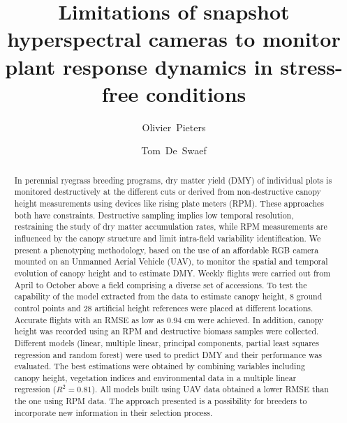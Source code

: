 \documentclass[10pt,authoryear,a4paper]{elsarticle}
\begin{document}
\begin{frontmatter}

\title{Limitations of snapshot hyperspectral cameras to monitor plant response dynamics in stress-free conditions}


\author[a,b]{Olivier~Pieters}

\author[b]{Tom~De~Swaef}


\address[a]{IDLab-AIRO -- Ghent University -- imec, Technologiepark-Zwijnaarde 126, 9052 Zwijnaarde, Belgium}
\address[b]{Plant Sciences Unit, Flanders Research Institute for Agriculture, Fisheries and Food, Caritasstraat 39, 9090 Melle, Belgium}

\begin{abstract}  
    In perennial ryegrass breeding programs, dry matter yield (DMY) of
    individual plots is monitored destructively at the different cuts or
    derived from non-destructive canopy height measurements using devices
    like rising plate meters (RPM). These approaches both have constraints.
    Destructive sampling implies low temporal resolution, restraining the
    study of dry matter accumulation rates, while RPM measurements are
    influenced by the canopy structure and limit intra-field variability
    identification. We present a phenotyping methodology, based on the use
    of an affordable RGB camera mounted on an Unmanned Aerial Vehicle (UAV),
    to monitor the spatial and temporal evolution of canopy height and to
    estimate DMY. Weekly flights were carried out from April to October
    above a field comprising a diverse set of accessions. To test the
    capability of the model extracted from the data to estimate canopy height, 
    8 ground control points and 28 artificial height references were placed 
    at different locations. Accurate flights with an RMSE as low as 0.94 cm were
    achieved. In addition, canopy height was recorded using an RPM and
    destructive biomass samples were collected. Different models (linear,
    multiple linear, principal components, partial least squares regression
    and random forest) were used to predict DMY and their performance was
    evaluated. The best estimations were obtained by combining variables
    including canopy height, vegetation indices and environmental data in a
    multiple linear regression (${R^2 = 0.81}$). All models built using UAV data
    obtained a lower RMSE than the one using RPM data. The approach
    presented is a possibility for breeders to incorporate new information
    in their selection process.
\end{abstract}


\end{frontmatter}
\end{document}
